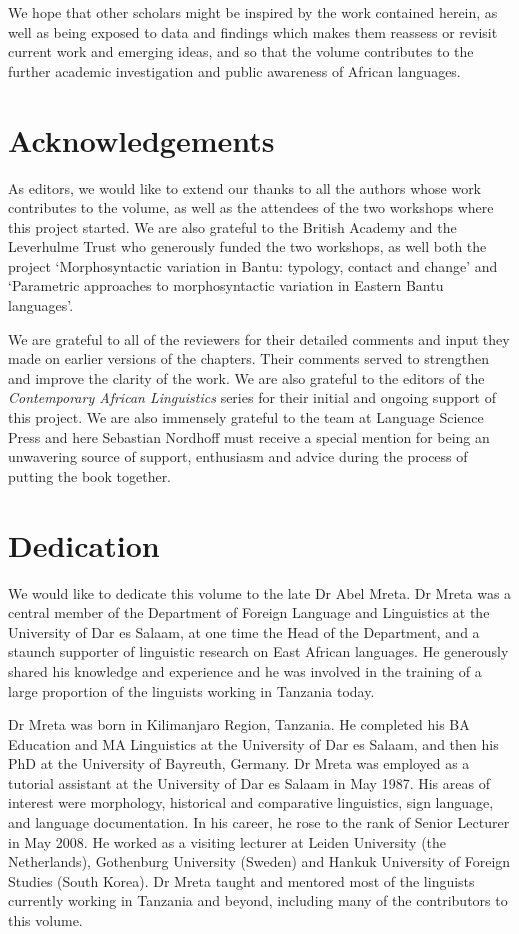 \documentclass[output=paper]{langscibook}
\begin{document}
We hope that other scholars might be inspired by the work contained herein, as well as being exposed to data and findings which makes them reassess or revisit current work and emerging ideas, and so that the volume contributes to the further academic investigation and public awareness of African languages.

\section{Acknowledgements}\largerpage

As editors, we would like to extend our thanks to all the authors whose work contributes to the volume, as well as the attendees of the two workshops where this project started. We are also grateful to the British Academy and the Leverhulme Trust who generously funded the two workshops, as well both the project ‘Morphosyntactic variation in Bantu: typology, contact and change’ and ‘Parametric approaches to morphosyntactic variation in Eastern Bantu languages’.

We are grateful to all of the reviewers for their detailed comments and input they made on earlier versions of the chapters. Their comments served to strengthen and improve the clarity of the work. We are also grateful to the editors of the \textit{Contemporary African Linguistics} series for their initial and ongoing support of this project. We are also immensely grateful to the team at Language Science Press and here Sebastian Nordhoff must receive a special mention for being an unwavering source of support, enthusiasm and advice during the process of putting the book together.

\section{Dedication}

We would like to dedicate this volume to the late Dr Abel Mreta. Dr Mreta was a central member of the Department of Foreign Language and Linguistics at the University of Dar es Salaam, at one time the Head of the Department, and a staunch supporter of linguistic research on East African languages. He generously shared his knowledge and experience and he was involved in the training of a large proportion of the linguists working in Tanzania today.

Dr Mreta was born in Kilimanjaro Region, Tanzania. He completed his BA Education and MA Linguistics at the University of Dar es Salaam, and then his PhD at the University of Bayreuth, Germany. Dr Mreta was employed as a tutorial assistant at the University of Dar es Salaam in {May 1987}. His areas of interest were morphology, historical and comparative linguistics, sign language, and language documentation. In his career, he rose to the rank of Senior Lecturer in {May 2008}. He worked as a visiting lecturer at Leiden University (the Netherlands), Gothenburg University (Sweden) and Hankuk University of Foreign Studies (South Korea). Dr Mreta taught and mentored most of the linguists currently working in Tanzania and beyond, including many of the contributors to this volume.
\end{document}
